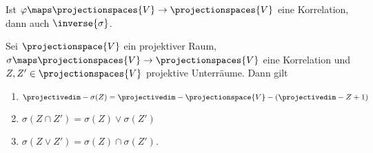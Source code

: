 \begin{bemerkung*}
  Ist \( \varphi\maps \projectionspaces{V}\to \projectionspaces{V} \) eine Korrelation, dann auch \( \inverse{\sigma} \).
\end{bemerkung*}
\begin{lemma}\label{korrelation_verhalten}
  Sei \( \projectionspace{V} \) ein projektiver Raum, \( \sigma\maps \projectionspaces{V}\to \projectionspaces{V} \) eine Korrelation und \( Z,Z'\in \projectionspaces{V} \) projektive Unterräume. Dann gilt
  \begin{enumerate}
    \item \label{dimension_unter_korrelation} \( \projectivedim-{\sigma(Z)}=\projectivedim-{\projectionspace{V}}-(\projectivedim-{Z}+1) \)
    \item \label{schnitt_unter_korrelation} \( \sigma(Z\cap Z')=\sigma(Z)\vee \sigma(Z') \)
    \item \label{verbindung_unter_korrelation} \( \sigma(Z\vee Z')=\sigma(Z)\cap \sigma(Z') \).
  \end{enumerate}
\end{lemma}
